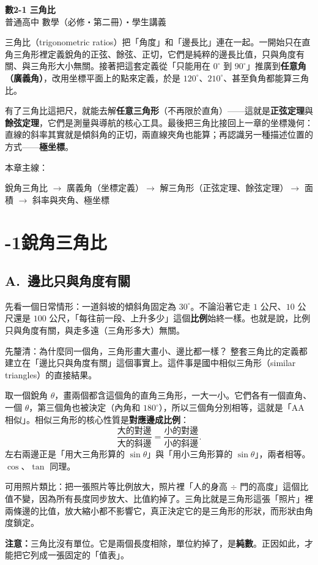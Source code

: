 \documentclass[11pt]{article}
\begin{document}
\begin{center}
{\sffamily\Huge\bfseries 數2-1 三角比}\\[3pt]
{\sffamily\large 普通高中 數學（必修・第二冊）・學生講義}
\end{center}
\vspace{0.6em}

三角比（trigonometric ratios）把「角度」和「邊長比」連在一起。一開始只在直角三角形裡定義銳角的正弦、餘弦、正切，它們是純粹的邊長比值，只與角度有關、與三角形大小無關。接著把這套定義從「只能用在 $0^\circ$ 到 $90^\circ$」推廣到\textbf{任意角（廣義角）}，改用坐標平面上的點來定義，於是 $120^\circ$、$210^\circ$、甚至負角都能算三角比。

有了三角比這把尺，就能去解\textbf{任意三角形}（不再限於直角）——這就是\textbf{正弦定理}與\textbf{餘弦定理}，它們是測量與導航的核心工具。最後把三角比接回上一章的坐標幾何：直線的斜率其實就是傾斜角的正切，兩直線夾角也能算；再認識另一種描述位置的方式——\textbf{極坐標}。

\medskip
本章主線：

\begin{center}
銳角三角比 $\rightarrow$ 廣義角（坐標定義）$\rightarrow$ 解三角形（正弦定理、餘弦定理）$\rightarrow$ 面積 $\rightarrow$ 斜率與夾角、極坐標
\end{center}

\section*{-1\quad 銳角三角比}

\subsection*{\sffamily A.\ 邊比只與角度有關}

先看一個日常情形：一道斜坡的傾斜角固定為 $30^\circ$。不論沿著它走 $1$ 公尺、$10$ 公尺還是 $100$ 公尺，「每往前一段、上升多少」這個\textbf{比例}始終一樣。也就是說，比例只與角度有關，與走多遠（三角形多大）無關。

\begin{補充框}{先釐清：為什麼同一個角，三角形畫大畫小、邊比都一樣？}
整套三角比的定義都建立在「邊比只與角度有關」這個事實上。這件事是國中相似三角形（similar triangles）的直接結果。

取一個銳角 $\theta$，畫兩個都含這個角的直角三角形，一大一小。它們各有一個直角、一個 $\theta$，第三個角也被決定（內角和 $180^\circ$），所以三個角分別相等，這就是「AA 相似」。相似三角形的核心性質是\textbf{對應邊成比例}：
$$\frac{\text{大的對邊}}{\text{大的斜邊}}=\frac{\text{小的對邊}}{\text{小的斜邊}}.$$
左右兩邊正是「用大三角形算的 $\sin\theta$」與「用小三角形算的 $\sin\theta$」，兩者相等。$\cos$、$\tan$ 同理。

可用照片類比：把一張照片等比例放大，照片裡「人的身高 $\div$ 門的高度」這個比值不變，因為所有長度同步放大、比值約掉了。三角比就是三角形這張「照片」裡兩條邊的比值，放大縮小都不影響它，真正決定它的是三角形的形狀，而形狀由角度鎖定。

\textbf{注意：}三角比沒有單位。它是兩個長度相除，單位約掉了，是\textbf{純數}。正因如此，才能把它列成一張固定的「值表」。
\end{補充框}
\end{document}

